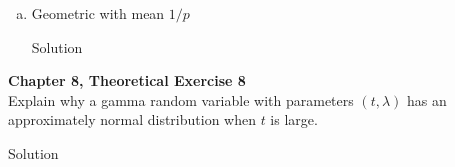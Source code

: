 \documentclass{article}
\begin{document}
\begin{spacing}{1.1}
\begin{homeworkProblem}
\begin{enumerate}[(a)]
\begin{homeworkSection}{Solution}
      \end{homeworkSection}
    \item Geometric with mean $1/p$
      \begin{homeworkSection}{Solution}
      
      \end{homeworkSection}
  \end{enumerate}
\end{homeworkProblem}

\newpage
\begin{homeworkProblem}
  {\bf Chapter 8, Theoretical Exercise 8}\\
  Explain why a gamma random variable with parameters $(t, \lambda)$ has 
  an approximately normal distribution when $t$ is large.
  \begin{homeworkSection}{Solution}
    
  \end{homeworkSection}
\end{homeworkProblem}


\end{spacing}
\end{document}
